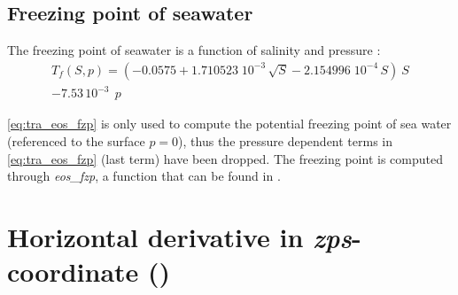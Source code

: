 \documentclass[../main/NEMO_manual]{subfiles}
\begin{document}
\subsection{Freezing point of seawater}
\label{subsec:TRA_fzp}

The freezing point of seawater is a function of salinity and pressure \citep{UNESCO1983}:
\begin{equation}
  \label{eq:tra_eos_fzp}
  \begin{split}
    T_f (S,p) = \left( -0.0575 + 1.710523 \;10^{-3} \, \sqrt{S} -  2.154996 \;10^{-4} \,S  \right) \ S    \\
    - 7.53\,10^{-3} \ \ p
  \end{split}
\end{equation}

\autoref{eq:tra_eos_fzp} is only used to compute the potential freezing point of sea water
(\ie referenced to the surface $p=0$),
thus the pressure dependent terms in \autoref{eq:tra_eos_fzp} (last term) have been dropped.
The freezing point is computed through \textit{eos\_fzp},
a \fortran function that can be found in .  



%


\section{Horizontal derivative in \textit{zps}-coordinate (\protect{})}
\label{sec:TRA_zpshde}

\end{document}
